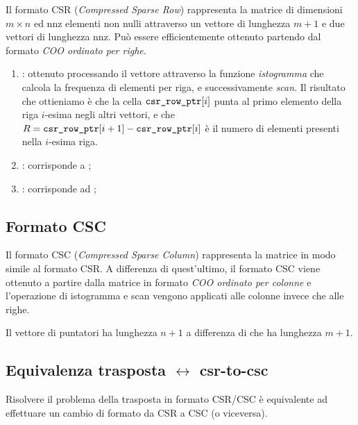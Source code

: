 Il formato CSR (\emph{Compressed Sparse Row}) rappresenta la matrice di dimensioni $m \times n$ ed $\mathrm{nnz}$ elementi non nulli attraverso un vettore di lunghezza $m+1$ e due vettori di lunghezza $\mathrm{nnz}$. Può essere efficientemente ottenuto partendo dal formato \emph{COO ordinato per righe}. 
\begin{enumerate}
\item {}: ottenuto processando il vettore  attraverso la funzione \emph{istogramma} che calcola la frequenza di elementi per riga, e successivamente \emph{scan}. Il risultato che ottieniamo è che la cella $\texttt{csr\_row\_ptr}[i]$ punta al primo elemento della riga $i$-esima negli altri vettori, e che $R = \texttt{csr\_row\_ptr}[i+1] - \texttt{csr\_row\_ptr}[i]$ è il numero di elementi presenti nella $i$-esima riga.
\item {}: corrisponde a ;
\item {}: corrisponde ad ;
\end{enumerate}

\subsection{Formato CSC}\label{csc}

Il formato CSC (\emph{Compressed Sparse Column}) rappresenta la matrice in modo simile al formato CSR. A differenza di quest'ultimo, il formato CSC viene ottenuto a partire dalla matrice in formato \emph{COO ordinato per colonne} e l'operazione di istogramma e scan vengono applicati alle colonne invece che alle righe. 

Il vettore di puntatori  ha lunghezza $n+1$ a differenza di  che ha lunghezza $m+1$.

\subsection{Equivalenza trasposta $\leftrightarrow$ csr-to-csc}\label{csr-to-csc}

Risolvere il problema della trasposta in formato CSR/CSC è equivalente ad effettuare un cambio di formato da CSR a CSC (o viceversa). 